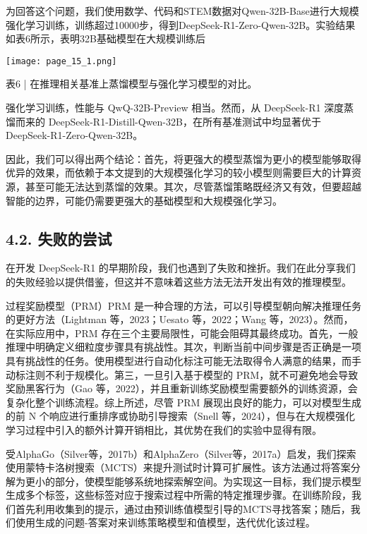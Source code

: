 \documentclass[12pt,a4paper]{report} %
\begin{document}
为回答这个问题，我们使用数学、代码和STEM数据对Qwen-32B-Base进行大规模强化学习训练，训练超过10000步，得到DeepSeek-R1-Zero-Qwen-32B。实验结果如表6所示，表明32B基础模型在大规模训练后
\begin{center}
\texttt{[image: page\_15\_1.png]}
\end{center}
\begin{center}
表6 | 在推理相关基准上蒸馏模型与强化学习模型的对比。
\end{center}






强化学习训练，性能与 QwQ-32B-Preview 相当。然而，从 DeepSeek-R1 深度蒸馏而来的 DeepSeek-R1-Distill-Qwen-32B，在所有基准测试中均显著优于 DeepSeek-R1-Zero-Qwen-32B。


因此，我们可以得出两个结论：首先，将更强大的模型蒸馏为更小的模型能够取得优异的效果，而依赖于本文提到的大规模强化学习的较小模型则需要巨大的计算资源，甚至可能无法达到蒸馏的效果。其次，尽管蒸馏策略既经济又有效，但要超越智能的边界，可能仍需要更强大的基础模型和大规模强化学习。


\subsection*{4.2. 失败的尝试}


在开发 DeepSeek-R1 的早期阶段，我们也遇到了失败和挫折。我们在此分享我们的失败经验以提供借鉴，但这并不意味着这些方法无法开发出有效的推理模型。


过程奖励模型（PRM）PRM 是一种合理的方法，可以引导模型朝向解决推理任务的更好方法（Lightman 等，2023；Uesato 等，2022；Wang 等，2023）。然而，在实际应用中，PRM 存在三个主要局限性，可能会阻碍其最终成功。首先，一般推理中明确定义细粒度步骤具有挑战性。其次，判断当前中间步骤是否正确是一项具有挑战性的任务。使用模型进行自动化标注可能无法取得令人满意的结果，而手动标注则不利于规模化。第三，一旦引入基于模型的 PRM，就不可避免地会导致奖励黑客行为（Gao 等，2022），并且重新训练奖励模型需要额外的训练资源，会复杂化整个训练流程。综上所述，尽管 PRM 展现出良好的能力，可以对模型生成的前 N 个响应进行重排序或协助引导搜索（Snell 等，2024），但与在大规模强化学习过程中引入的额外计算开销相比，其优势在我们的实验中显得有限。


受AlphaGo（Silver等，2017b）和AlphaZero（Silver等，2017a）启发，我们探索使用蒙特卡洛树搜索（MCTS）来提升测试时计算可扩展性。该方法通过将答案分解为更小的部分，使模型能够系统地探索解空间。为实现这一目标，我们提示模型生成多个标签，这些标签对应于搜索过程中所需的特定推理步骤。在训练阶段，我们首先利用收集到的提示，通过由预训练值模型引导的MCTS寻找答案；随后，我们使用生成的问题-答案对来训练策略模型和值模型，迭代优化该过程。
\end{document}
